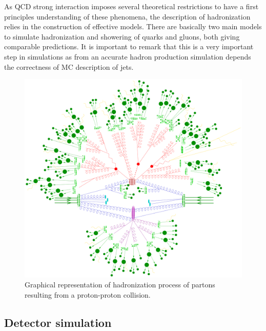 As QCD strong interaction imposes several theoretical restrictions to have a first principles understanding of these phenomena, the description of hadronization relies in the construction of effective models. There are basically two main models to simulate hadronization and showering of quarks and gluons, both giving comparable predictions. It is important to remark that this is a very important step in simulations as from an accurate hadron production simulation depends the correctness of MC description of jets.

\begin{figure}[!Hhtbp]
  \begin{center}
    \includegraphics[width=\textwidth]{figs/parton_shower.png}
    \caption{Graphical representation of hadronization process of partons resulting from a proton-proton collision.}
    \label{fig:Hadr}
  \end{center}
\end{figure}

\subsection{Detector simulation}
\label{sec:detector}

